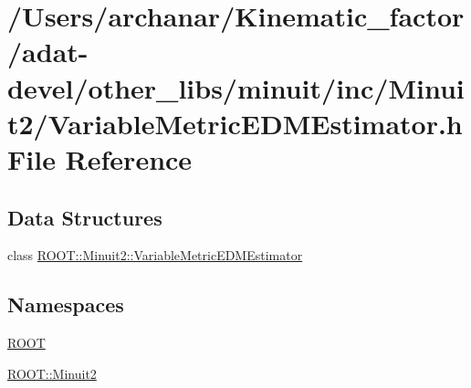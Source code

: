 \hypertarget{adat-devel_2other__libs_2minuit_2inc_2Minuit2_2VariableMetricEDMEstimator_8h}{}\section{/\+Users/archanar/\+Kinematic\+\_\+factor/adat-\/devel/other\+\_\+libs/minuit/inc/\+Minuit2/\+Variable\+Metric\+E\+D\+M\+Estimator.h File Reference}
\label{adat-devel_2other__libs_2minuit_2inc_2Minuit2_2VariableMetricEDMEstimator_8h}
\subsection*{Data Structures}
\begin{DoxyCompactItemize}
\item 
class \mbox{\hyperlink{classROOT_1_1Minuit2_1_1VariableMetricEDMEstimator}{R\+O\+O\+T\+::\+Minuit2\+::\+Variable\+Metric\+E\+D\+M\+Estimator}}
\end{DoxyCompactItemize}
\subsection*{Namespaces}
\begin{DoxyCompactItemize}
\item 
 \mbox{\hyperlink{namespaceROOT}{R\+O\+OT}}
\item 
 \mbox{\hyperlink{namespaceROOT_1_1Minuit2}{R\+O\+O\+T\+::\+Minuit2}}
\end{DoxyCompactItemize}
